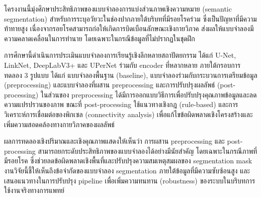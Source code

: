 \maketitle
\makesignature

\ifproject
\begin{abstractTH}
โครงงานนี้มุ่งศึกษาประสิทธิภาพของแบบจำลองการแบ่งส่วนภาพเชิงความหมาย (semantic segmentation) สำหรับการระบุอวัยวะในช่องปากภายใต้บริบทที่มีรอยโรคร่วม ซึ่งเป็นปัญหาที่มีความท้าทายสูง เนื่องจากรอยโรคสามารถก่อให้เกิดการบิดเบือนลักษณะเชิงกายวิภาค ส่งผลให้แบบจำลองมีความคลาดเคลื่อนในการทำนาย โดยเฉพาะในกรณีข้อมูลที่ไม่ปรากฏในชุดฝึก

การศึกษานี้ดำเนินการประเมินแบบจำลองการเรียนรู้เชิงลึกหลายสถาปัตยกรรม ได้แก่ U-Net, LinkNet, DeepLabV3+ และ UPerNet ร่วมกับ encoder ที่หลากหลาย ภายใต้กรอบการทดลอง 3 รูปแบบ ได้แก่ แบบจำลองพื้นฐาน (baseline), แบบจำลองร่วมกับกระบวนการเตรียมข้อมูล (preprocessing) และแบบจำลองที่ผสาน preprocessing และการปรับปรุงผลลัพธ์ (post-processing)
ในส่วนของ preprocessing ได้มีการออกแบบวิธีการเพื่อปรับปรุงคุณภาพข้อมูลและลดความแปรปรวนของภาพ ขณะที่ post-processing ใช้แนวทางเชิงกฎ (rule-based) และการวิเคราะห์การเชื่อมต่อของพิกเซล (connectivity analysis) เพื่อแก้ไขข้อผิดพลาดเชิงโครงสร้างและเพิ่มความสอดคล้องทางกายวิภาคของผลลัพธ์

ผลการทดลองเชิงปริมาณและเชิงคุณภาพแสดงให้เห็นว่า การผสาน preprocessing และ post-processing สามารถยกระดับประสิทธิภาพของแบบจำลองได้อย่างมีนัยสำคัญ โดยเฉพาะในกรณีภาพที่มีรอยโรค ซึ่งช่วยลดข้อผิดพลาดเชิงพื้นที่และปรับปรุงความสมเหตุสมผลของ segmentation mask
งานวิจัยนี้ชี้ให้เห็นถึงข้อจำกัดของแบบจำลอง segmentation ภายใต้ข้อมูลที่มีความซับซ้อนสูง และเสนอแนวทางในการปรับปรุง pipeline เพื่อเพิ่มความทนทาน (robustness) ของระบบในบริบทการใช้งานจริงทางการแพทย์
\end{abstractTH}

